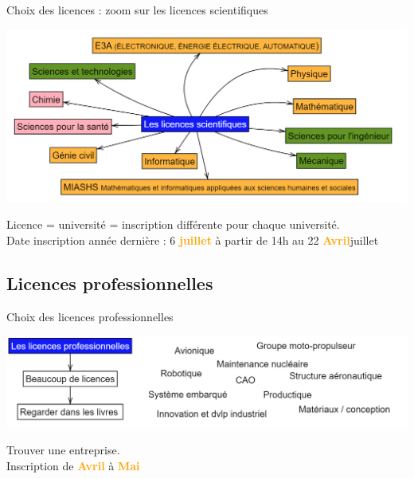 \documentclass[usenames,dvipsnames,13pt,aspectratio=169]{beamer}
\begin{document}
\begin{frame}{Choix des licences : zoom sur les licences scientifiques}

	\begin{center}
	     \includegraphics[width=1\textwidth]{S14.png}
	\end{center}

Licence = université = inscription différente pour chaque université.\\
Date inscription année dernière : 6 \textcolor{orange}{\textbf{juillet}} à partir de 14h au 22 \textcolor{orange}{\textbf{Avril}}juillet 

\end{frame}

\subsection{Licences professionnelles}


\begin{frame}{Choix des licences professionnelles}

	\begin{center}
	     \includegraphics[width=1\textwidth]{S15.png}
	\end{center}

Trouver une entreprise. \\
Inscription de \textcolor{orange}{\textbf{Avril}} à \textcolor{orange}{\textbf{Mai}}

\end{frame}
\end{document}
